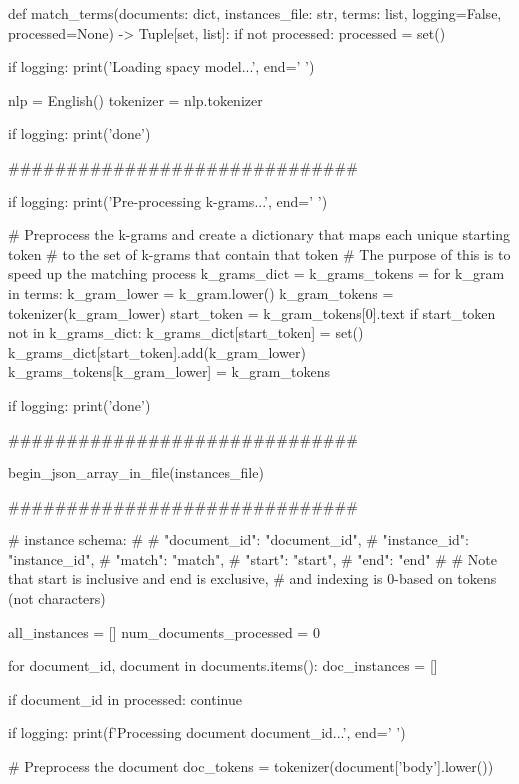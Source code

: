 \begin{pyin}
def match_terms(documents: dict, instances_file: str, terms: list, logging=False, processed=None) -> Tuple[set, list]:
    if not processed:
        processed = set()

    if logging:
        print('Loading spacy model...', end=' ')

    nlp = English()
    tokenizer = nlp.tokenizer

    if logging:
        print('done')

    ##############################

    if logging:
        print('Pre-processing k-grams...', end=' ')

    # Preprocess the k-grams and create a dictionary that maps each unique starting token
    # to the set of k-grams that contain that token
    # The purpose of this is to speed up the matching process
    k_grams_dict = {}
    k_grams_tokens = {}
    for k_gram in terms:
        k_gram_lower = k_gram.lower()
        k_gram_tokens = tokenizer(k_gram_lower)
        start_token = k_gram_tokens[0].text
        if start_token not in k_grams_dict:
            k_grams_dict[start_token] = set()
        k_grams_dict[start_token].add(k_gram_lower)
        k_grams_tokens[k_gram_lower] = k_gram_tokens

    if logging:
        print('done')

    ##############################

    begin_json_array_in_file(instances_file)

    ##############################

    # instance schema:
    # {
    #     "document_id": "document_id",
    #     "instance_id": "instance_id",
    #     "match": "match",
    #     "start": "start",
    #     "end": "end"
    # }
    # Note that start is inclusive and end is exclusive,
    # and indexing is 0-based on tokens (not characters)

    all_instances = []
    num_documents_processed = 0

    for document_id, document in documents.items():
        doc_instances = []

        if document_id in processed:
            continue

        if logging:
            print(f'Processing document {document_id}...', end=' ')

        # Preprocess the document
        doc_tokens = tokenizer(document['body'].lower())


\end{pyin}
